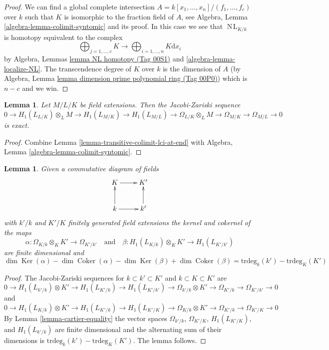 \documentclass{amsart}
\theoremstyle{plain}
\newtheorem{lemma}[subsection]{Lemma}
\theoremstyle{definition}
\theoremstyle{remark}
\numberwithin{equation}{subsection}
\def\NL{\mathop{N\!L}\nolimits}
\def\Ker{\mathop{\mathrm{Ker}}}
\def\Coker{\mathop{\mathrm{Coker}}}
\begin{document}
\begin{proof}
We can find a global complete intersection
$A = k[x_1, \ldots, x_n]/(f_1, \ldots, f_c)$
over $k$ such that
$K$ is isomorphic to the fraction field of $A$, see
Algebra, Lemma \ref{algebra-lemma-colimit-syntomic}
and its proof. In this case we see that $\NL_{K/k}$ is homotopy
equivalent to the complex
$$
\bigoplus\nolimits_{j = 1, \ldots, c} K \longrightarrow
\bigoplus\nolimits_{i = 1, \ldots, n} K\text{d}x_i
$$
by Algebra, Lemmas \href{https://stacks.math.columbia.edu/tag/00S1}{lemma NL homotopy (Tag 00S1)} and
\ref{algebra-lemma-localize-NL}.
The transcendence degree of $K$ over $k$ is the dimension of $A$
(by Algebra, Lemma \href{https://stacks.math.columbia.edu/tag/00P0}{lemma dimension prime polynomial ring (Tag 00P0)})
which is $n - c$ and we win.
\end{proof}


\begin{lemma}
\label{lemma-transitivity-gamma}
Let $M/L/K$ be field extensions. Then the Jacobi-Zariski
sequence
$$
0 \to H_1(L_{L/K}) \otimes_L M \to
H_1(L_{M/K}) \to
H_1(L_{M/L}) \to
\Omega_{L/K} \otimes_L M \to
\Omega_{M/K} \to
\Omega_{M/L} \to 0
$$
is exact.
\end{lemma}

\begin{proof}
Combine
Lemma \ref{lemma-transitive-colimit-lci-at-end}
with
Algebra, Lemma \ref{algebra-lemma-colimit-syntomic}.
\end{proof}


\begin{lemma}
\label{lemma-gamma-commutative-diagram}
Given a commutative diagram of fields
$$
\xymatrix{
K \ar[r] & K' \\
k \ar[u] \ar[r] & k' \ar[u]
}
$$
with $k'/k$ and $K'/K$ finitely generated field extensions
the kernel and cokernel of the maps
$$
\alpha : \Omega_{K/k} \otimes_K K' \to \Omega_{K'/k'}
\quad\text{and}\quad
\beta : H_1(L_{K/k}) \otimes_K K' \to H_1(L_{K'/k'})
$$
are finite dimensional and
$$
\dim \Ker(\alpha) - \dim \Coker(\alpha)
-\dim \Ker(\beta) + \dim \Coker(\beta)
=
\text{trdeg}_k(k') - \text{trdeg}_K(K')
$$
\end{lemma}

\begin{proof}
The Jacobi-Zariski sequences for $k \subset k' \subset K'$ and
$k \subset K \subset K'$ are
$$
0 \to H_1(L_{k'/k}) \otimes K'  \to
H_1(L_{K'/k}) \to
H_1(L_{K'/k'}) \to
\Omega_{k'/k} \otimes K' \to
\Omega_{K'/k} \to
\Omega_{K'/k'} \to 0
$$
and
$$
0 \to H_1(L_{K/k}) \otimes K' \to
H_1(L_{K'/k}) \to
H_1(L_{K'/K}) \to
\Omega_{K/k} \otimes K' \to
\Omega_{K'/k} \to
\Omega_{K'/K} \to 0
$$
By
Lemma \ref{lemma-cartier-equality}
the vector spaces $\Omega_{k'/k}$, $\Omega_{K'/K}$, $H_1(L_{K'/K})$, and
$H_1(L_{k'/k})$ are finite dimensional and the alternating sum of their
dimensions is $\text{trdeg}_k(k') - \text{trdeg}_K(K')$.
The lemma follows.
\end{proof}
\end{document}
